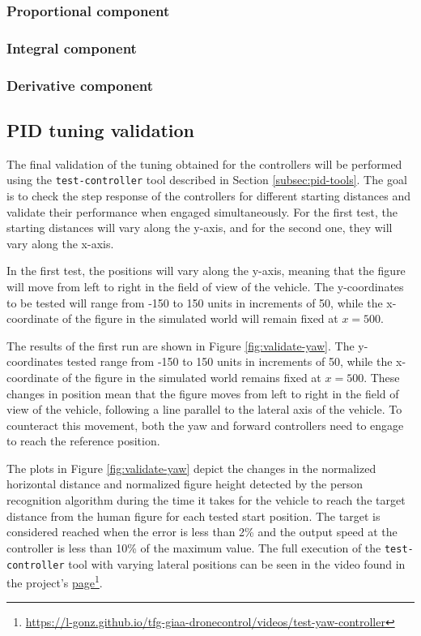 \subsubsection{Proportional component}
\subsubsection{Integral component}
\subsubsection{Derivative component}

\subsection{PID tuning validation}
\label{subsec:pid-test-controller}

The final validation of the tuning obtained for the controllers will be performed using the \texttt{test-controller} tool described in Section \ref{subsec:pid-tools}. The goal is to check the step response of the controllers for different starting distances and validate their performance when engaged simultaneously. For the first test, the starting distances will vary along the y-axis, and for the second one, they will vary along the x-axis.

In the first test, the positions will vary along the y-axis, meaning that the figure will move from left to right in the field of view of the vehicle. The y-coordinates to be tested will range from -150 to 150 units in increments of 50, while the x-coordinate of the figure in the simulated world will remain fixed at $x=500$.

The results of the first run are shown in Figure \ref{fig:validate-yaw}. The y-coordinates tested range from -150 to 150 units in increments of 50, while the x-coordinate of the figure in the simulated world remains fixed at $x=500$. These changes in position mean that the figure moves from left to right in the field of view of the vehicle, following a line parallel to the lateral axis of the vehicle. To counteract this movement, both the yaw and forward controllers need to engage to reach the reference position.

The plots in Figure \ref{fig:validate-yaw} depict the changes in the normalized horizontal distance and normalized figure height detected by the person recognition algorithm during the time it takes for the vehicle to reach the target distance from the human figure for each tested start position. The target is considered reached when the error is less than 2\% and the output speed at the controller is less than 10\% of the maximum value. The full execution of the \texttt{test-controller} tool with varying lateral positions can be seen in the video found in the project's \href{https://l-gonz.github.io/tfg-giaa-dronecontrol/videos/test-yaw-controller}{page}\footnote{\url{https://l-gonz.github.io/tfg-giaa-dronecontrol/videos/test-yaw-controller}}.

